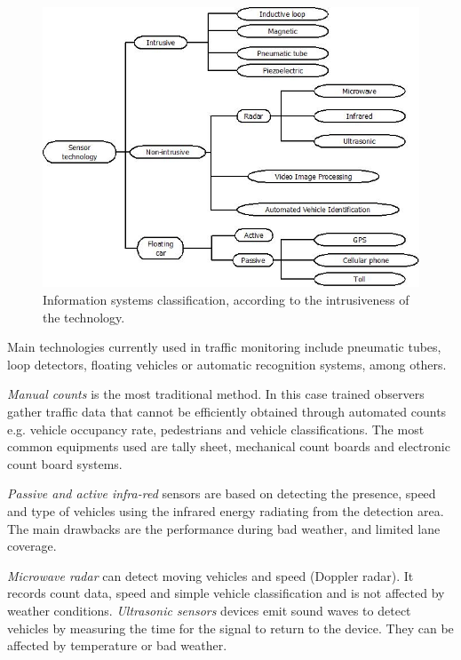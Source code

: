 \documentclass{llncs}
\begin{document}
\begin{figure}[htpb] 
\begin{center} 
\includegraphics[scale=0.55]{intrusivos.jpeg}  %
\end{center} 
\caption{Information systems classification, according to the intrusiveness of the technology.} 
\label{tipossensores} 
\end{figure}

Main technologies currently used in traffic monitoring include pneumatic tubes, loop detectors, floating vehicles or automatic recognition systems, among others.


\emph{Manual counts} is the most traditional method. In this case trained observers gather traffic data that cannot be efficiently obtained through automated counts e.g. vehicle occupancy rate, pedestrians and vehicle classifications. The most common equipments used are tally sheet, mechanical count boards and electronic count board systems.

\emph{Passive and active infra-red} sensors are based on detecting the presence, speed and type of vehicles using the infrared energy radiating from the detection area. The main drawbacks are the performance during bad weather, and limited lane coverage.

\emph{Microwave radar} can detect moving vehicles and speed (Doppler radar). It records count data, speed and simple vehicle classification and is not affected by weather conditions.
\emph{Ultrasonic sensors} devices emit sound waves to detect vehicles by measuring the time for the signal to return to the device. They can be affected by temperature or bad weather. 
\end{document}
